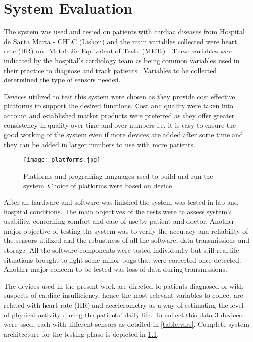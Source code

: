
\chapter{System Evaluation}
\label{chapter:evaluation}

The system was used and tested on patients with cardiac diseases from Hospital de Santa Marta - CHLC (Lisbon) and the main variables collected were heart rate (HR) and Metabolic Equivalent of Tasks (METs) \cite{crouter_METS}. These variables were indicated by the hospital's cardiology team as being common variables used in their practice to diagnose and track patients \cite{importancia_HR_METS, importancia_HR_METS_2}. Variables to be collected determined the type of sensors needed.

Devices utilized to test this system were chosen as they provide cost effective platforms to support the desired functions. Cost and quality were taken into account and established market products were preferred as they offer greater consistency in quality over time and over numbers i.e. it is easy to ensure the good working of the system even if more devices are added after some time and they can be added in larger numbers to use with more patients.

\begin{figure}[!h]
	\centering
	\texttt{[image: platforms.jpg]}
	\caption{Platforms and programing languages used to build and run the system. Choice of platforms were based on device}
	\label{fig:platforms}
\end{figure}

After all hardware and software was finished the system was tested in lab and hospital conditions. The main objectives of the tests were to assess system's usability, concerning comfort and ease of use by patient and doctor. Another major objective of testing the system was to verify the accuracy and reliability of the sensors utilized and the robustness of all the software, data transmissions and storage. All the software components were tested individually but still real life situations brought to light some minor bugs that were corrected once detected. Another major concern to be tested was loss of data during transmissions.

The devices used in the present work are directed to patients diagnosed or with suspects of cardiac insufficiency, hence the most relevant variables to collect are related with heart rate (HR) and accelerometry as a way of estimating the level of physical activity during the patients' daily life. To collect this data 3 devices were used, each with different sensors as detailed in \cref{table:vars}. Complete system architecture for the testing phase is depicted in \cref{fig:platforms}.

